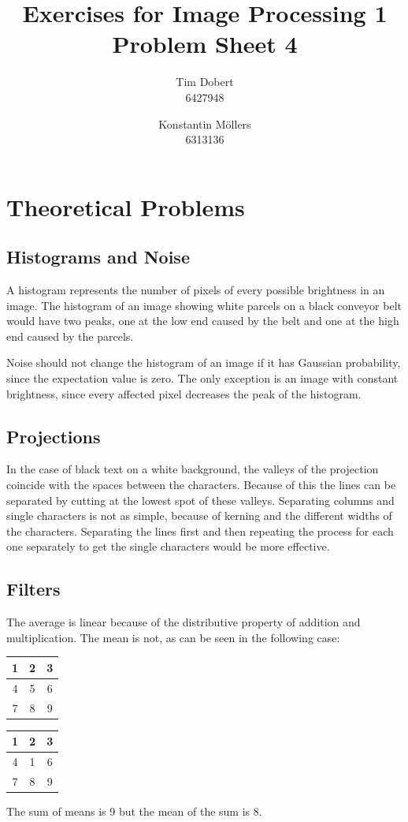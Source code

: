 \documentclass[a4paper,12pt]{article}
\title{\textbf{Exercises for Image Processing 1}\\Problem Sheet 4}
\author{Tim Dobert\\6427948 \and Konstantin M\"ollers\\6313136}
\begin{document}
	\maketitle	
	
	\section{Theoretical Problems}
	\subsection{Histograms and Noise}
		A histogram represents the number of pixels of every possible brightness in an image. The histogram of an image showing white parcels on a black conveyor belt would have two peaks, one at the low end caused by the belt and one at the high end caused by the parcels.\par
		Noise should not change the histogram of an image if it has Gaussian probability, since the expectation value is zero. The only exception is an image with constant brightness, since every affected pixel decreases the peak of the histogram.

	
	\subsection{Projections}
	In the case of black text on a white background, the valleys of the projection coincide with the spaces between the characters. Because of this the lines can be separated by cutting at the lowest spot of these valleys. Separating columns and single characters is not as simple, because of kerning and the different widths of the characters. Separating the lines first and then repeating the process for each one separately to get the single characters would be more effective.
	
	\subsection{Filters}
	The average is linear because of the distributive property of addition and multiplication. The mean is not, as can be seen in the following case: 	
	\\
	\begin{center}
	\begin{tabular}{|c|c|c|}
	\hline
	1&2&3 \\
	\hline
	4&5&6 \\
	\hline
	7&8&9 \\
	\hline
	\end{tabular}
	\phantom{0000000000000}
	\begin{tabular}{|c|c|c|}
	\hline
	1&2&3 \\
	\hline
	4&1&6 \\
	\hline
	7&8&9 \\
	\hline
	\end{tabular}
	\end{center}
	The sum of means is 9 but the mean of the sum is 8.	
\end{document}

